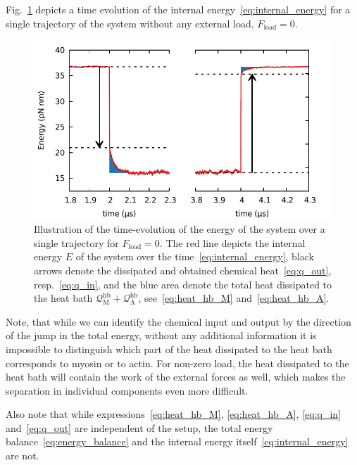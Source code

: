 \documentclass[aps,pre,twocolumn,showpacs,showkeys,superscriptaddress,floatfix]{revtex4-1}
\begin{document}
Fig.~\ref{fig:energy_evolution} depicts a time evolution of the internal energy~\eqref{eq:internal_energy} for a single trajectory of the system without any external load, $F_\text{load} = 0$.
\begin{figure}
\centering
\includegraphics[width=.9\linewidth,height=!]{energy_1head.pdf}
\caption{\label{fig:energy_evolution}
Illustration of the time-evolution of the energy of the system over a single trajectory for $F_\text{load} = 0$.
The red line depicts the internal energy $E$ of the system over the time~\eqref{eq:internal_energy},
black arrows denote the dissipated and obtained chemical heat~\eqref{eq:q_out}, resp.~\eqref{eq:q_in},
and the blue area denote the total heat dissipated to the heat bath ${\mathcal Q}_\text{M}^\text{hb} + {\mathcal Q}_\text{A}^\text{hb}$, 
see~\eqref{eq:heat_hb_M} and~\eqref{eq:heat_hb_A}.
}
\end{figure}
Note, that while we can identify the chemical input and output by the direction of the jump in the total energy, 
without any additional information it is impossible to distinguish which part of the heat dissipated to the heat bath corresponds to myosin or to actin.
For non-zero load, the heat dissipated to the heat bath will contain the work of the external forces as well,
which makes the separation in individual components even more difficult.

Also note that while expressions~\eqref{eq:heat_hb_M}, \eqref{eq:heat_hb_A}, \eqref{eq:q_in} and~\eqref{eq:q_out} are independent of the setup, 
the total energy balance~\eqref{eq:energy_balance} and the internal energy itself~\eqref{eq:internal_energy} are not. 
\end{document}
